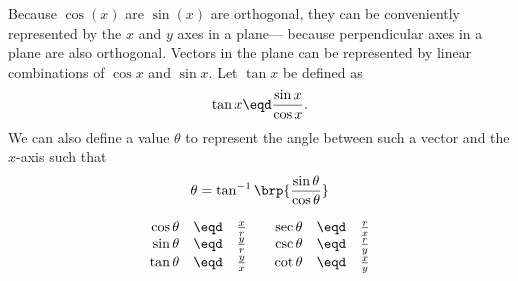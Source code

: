 Because $\cos(x)$ are $\sin(x)$ are orthogonal, they can be conveniently
represented by the $x$ and $y$ axes in a plane---
because perpendicular axes in a plane are also orthogonal.
Vectors in the plane can be represented by linear combinations of
$\cos x$ and $\sin x$.
Let $\tan x$ be defined as
  \[ \tan x \eqd \frac{\sin x}{\cos x}.\]
We can also define a value $\theta$ to represent the angle between such a vector
and the $x$-axis such that
  \[ \theta = \tan^{-1}\brp{\frac{\sin\theta}{\cos\theta}} \] %

\hfill%
\begin{minipage}{12\tw/16}
  \[\begin{array}{rcl@{\qquad}rcl}
    \cos\theta &\eqd& \frac{x}{r} & \sec\theta &\eqd& \frac{r}{x} \\
    \sin\theta &\eqd& \frac{y}{r} & \csc\theta &\eqd& \frac{r}{y} \\
    \tan\theta &\eqd& \frac{y}{x} & \cot\theta &\eqd& \frac{x}{y}
  \end{array}\]
\end{minipage}


%

